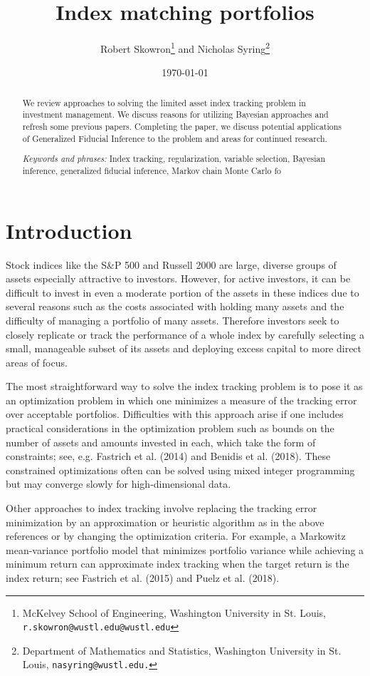 \documentclass[a4paper, 12pt]{article}
\title{Index matching portfolios}
\author{Robert Skowron\footnote{McKelvey School of Engineering, Washington University in St. Louis, {\tt r.skowron@wustl.edu@wustl.edu}} \quad and \quad Nicholas Syring\footnote{Department of Mathematics and Statistics, Washington University in St. Louis,  {\tt nasyring@wustl.edu.}}}
\date{\today}
\theoremstyle{plain}
\theoremstyle{definition}
\theoremstyle{remark}
\begin{document}
\maketitle



\begin{abstract}
	We review approaches to solving the limited asset index tracking problem in investment management. We discuss reasons for utilizing Bayesian approaches and refresh some previous papers. Completing the paper, we discuss potential applications of Generalized Fiducial Inference to the problem and areas for continued research.


\smallskip

\emph{Keywords and phrases:} Index tracking, regularization, variable selection, Bayesian inference, generalized fiducial inference, Markov chain Monte Carlo fo

\end{abstract}


\section{Introduction}
\label{S:intro}

Stock indices like the S\&P 500 and Russell 2000 are large, diverse groups of assets especially attractive to investors.  However, for active investors, it can be difficult to invest in even a moderate portion of the assets in these indices due to several reasons such as the costs associated with holding many assets and the difficulty of managing a portfolio of many assets.  Therefore investors seek to closely replicate or track the performance of a whole index by carefully selecting a small, manageable subset of its assets and deploying excess capital to more direct areas of focus.

The most straightforward way to solve the index tracking problem is to pose it as an optimization problem in which one minimizes a measure of the tracking error over acceptable portfolios.  Difficulties with this approach arise if one includes practical considerations in the optimization problem such as bounds on the number of assets and amounts invested in each, which take the form of constraints; see, e.g. Fastrich et al. (2014) and Benidis et al. (2018).  These constrained optimizations often can be solved using mixed integer programming but may converge slowly for high-dimensional data.  

Other approaches to index tracking involve replacing the tracking error minimization by an approximation or heuristic algorithm as in the above references or by changing the optimization criteria.  For example, a Markowitz mean-variance portfolio model that minimizes portfolio variance while achieving a minimum return can approximate index tracking when the target return is the index return; see Fastrich et al. (2015) and Puelz et al. (2018).   
\end{document}
